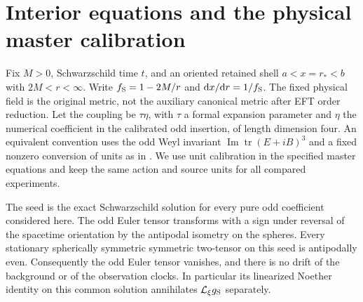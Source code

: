 \documentclass[11pt]{article}
\newcommand{\dd}{\mathrm d}
\newcommand{\Lie}{\mathcal L}
\newcommand{\Sch}{g_{\rm S}}
\begin{document}
\section{Interior equations and the physical master calibration}\label{sec:operators}

Fix $M>0$, Schwarzschild time $t$, and an oriented retained shell $a<x=r_*<b$ with $2M<r<\infty$. Write $f_{\rm S}=1-2M/r$ and $\dd x/\dd r=1/f_{\rm S}$. The fixed physical field is the original metric, not the auxiliary canonical metric after EFT order reduction. Let the coupling be $\tau\eta$, with $\tau$ a formal expansion parameter and $\eta$ the numerical coefficient in the calibrated odd insertion, of length dimension four. An equivalent convention uses the odd Weyl invariant $\operatorname{Im}\operatorname{tr}(E+iB)^3$ and a fixed nonzero conversion of units as in \cite{P27}. We use unit calibration in the specified master equations and keep the same action and source units for all compared experiments.

The seed is the exact Schwarzschild solution for every pure odd coefficient considered here. The odd Euler tensor transforms with a sign under reversal of the spacetime orientation by the antipodal isometry on the spheres. Every stationary spherically symmetric symmetric two-tensor on this seed is antipodally even. Consequently the odd Euler tensor vanishes, and there is no drift of the background or of the observation clocks. In particular its linearized Noether identity on this common solution annihilates $\Lie_\xi\Sch$ separately.
\end{document}
